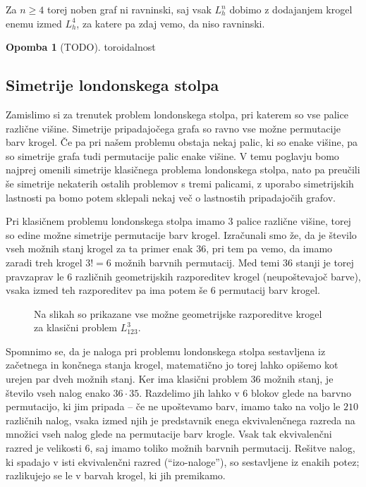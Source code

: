 \documentclass[12pt,a4paper]{amsart}
\theoremstyle{definition} %
\newtheorem{opomba}[definicija]{Opomba}
\theoremstyle{plain} %
\begin{document}
    Za $n \geq 4$ torej noben graf ni ravninski, saj vsak $L_h^n$ dobimo z dodajanjem krogel enemu izmed $L_h^4$, za katere pa zdaj vemo, da niso ravninski.
\endproof

\begin{opomba}
    [TODO] toroidalnost
\end{opomba}

\subsection{Simetrije londonskega stolpa}

Zamislimo si za trenutek problem londonskega stolpa, pri katerem so vse palice različne višine. Simetrije pripadajočega grafa so ravno vse možne permutacije barv krogel.
Če pa pri našem problemu obstaja nekaj palic, ki so enake višine, pa so simetrije grafa tudi permutacije palic enake višine.
V temu poglavju bomo najprej omenili simetrije klasičnega problema londonskega stolpa, nato pa preučili še simetrije nekaterih ostalih problemov s tremi palicami, z uporabo simetrijskih lastnosti pa bomo potem sklepali nekaj več o lastnostih pripadajočih grafov.

Pri klasičnem problemu londonskega stolpa imamo $3$ palice različne višine, torej so edine možne simetrije permutacije barv krogel. 
Izračunali smo že, da je število vseh možnih stanj krogel za ta primer enak 36, pri tem pa vemo, da imamo zaradi treh krogel $3! = 6$ možnih barvnih permutacij. Med temi $36$ stanji je torej pravzaprav le $6$ različnih geometrijskih razporeditev krogel (neupoštevajoč barve), vsaka izmed teh razporeditev pa ima potem še $6$ permutacij barv krogel.

\begin{figure}
    \caption{Na slikah so prikazane vse možne geometrijske razporeditve krogel za klasični problem $L_{123}^3$.}
\end{figure}

Spomnimo se, da je naloga pri problemu londonskega stolpa sestavljena iz začetnega in končnega stanja krogel, matematično jo torej lahko opišemo kot urejen par dveh možnih stanj. Ker ima klasični problem 36 možnih stanj, je število vseh nalog enako $36 \cdot 35$. Razdelimo jih lahko v $6$ blokov glede na barvno permutacijo, ki jim pripada -- če ne upoštevamo barv, imamo tako na voljo le $210$ različnih nalog, vsaka izmed njih je predstavnik enega ekvivalenčnega razreda na množici vseh nalog glede na permutacije barv krogle. Vsak tak ekvivalenčni razred je velikosti $6$, saj imamo toliko možnih barvnih permutacij. Rešitve nalog, ki spadajo v isti ekvivalenčni razred (``izo-naloge''), so sestavljene iz enakih potez;  razlikujejo se le v barvah krogel, ki jih premikamo. \cite[str.\ 591]{bib:tolspatial}
\end{document}
